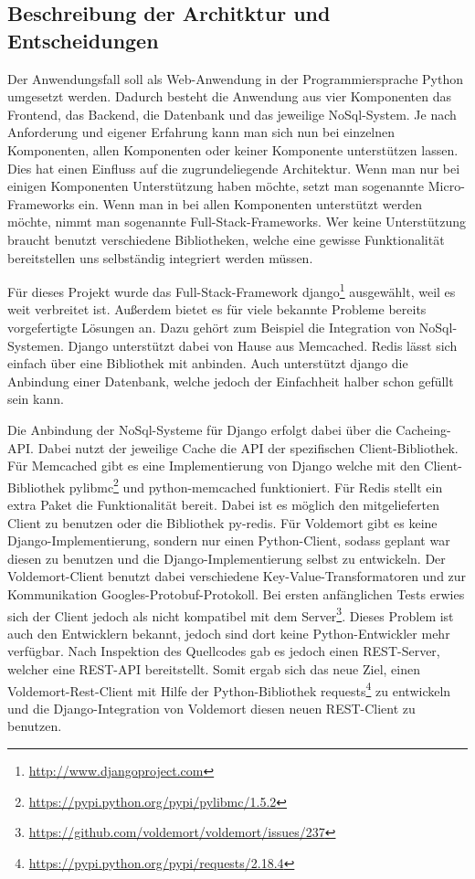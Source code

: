 {\subsection{Beschreibung der Architktur und Entscheidungen}
Der Anwendungsfall soll als Web-Anwendung in der Programmiersprache Python
umgesetzt werden. Dadurch besteht die Anwendung aus vier Komponenten das
Frontend, das Backend, die Datenbank und das jeweilige NoSql-System. Je nach
Anforderung und eigener Erfahrung kann man sich nun bei einzelnen Komponenten,
allen Komponenten oder keiner Komponente unterstützen lassen. Dies hat einen
Einfluss auf die zugrundeliegende Architektur. Wenn man nur bei einigen
Komponenten Unterstützung haben möchte, setzt man sogenannte Micro-Frameworks
ein. Wenn man in bei allen Komponenten unterstützt werden möchte, nimmt man
sogenannte Full-Stack-Frameworks. Wer keine Unterstützung braucht benutzt
verschiedene Bibliotheken, welche eine gewisse Funktionalität bereitstellen uns
selbständig integriert werden müssen.

Für dieses Projekt wurde das Full-Stack-Framework
django\footnote{\url{http://www.djangoproject.com}} ausgewählt, weil es weit
verbreitet ist. Außerdem bietet es für viele bekannte Probleme bereits
vorgefertigte Lösungen an. Dazu gehört zum Beispiel die Integration von
NoSql-Systemen. Django unterstützt dabei von Hause aus Memcached. Redis lässt
sich einfach über eine Bibliothek mit anbinden. Auch unterstützt django die
Anbindung einer Datenbank, welche jedoch der Einfachheit halber schon gefüllt
sein kann.

Die Anbindung der NoSql-Systeme für Django erfolgt dabei über die Cacheing-API.
Dabei nutzt der jeweilige Cache die API der spezifischen Client-Bibliothek. Für
Memcached gibt es eine Implementierung von Django welche mit den
Client-Bibliothek
pylibmc\footnote{\url{https://pypi.python.org/pypi/pylibmc/1.5.2}} und
python-memcached funktioniert. Für Redis stellt ein extra Paket die
Funktionalität bereit. Dabei ist es möglich den mitgelieferten Client zu
benutzen oder die Bibliothek py-redis. Für Voldemort gibt es keine
Django-Implementierung, sondern nur einen Python-Client, sodass geplant war
diesen zu benutzen und die Django-Implementierung selbst zu entwickeln. Der
Voldemort-Client benutzt dabei verschiedene Key-Value-Transformatoren und zur
Kommunikation Googles-Protobuf-Protokoll. Bei ersten anfänglichen Tests erwies
sich der Client jedoch als nicht kompatibel mit dem
Server\footnote{\url{https://github.com/voldemort/voldemort/issues/237}}.
Dieses Problem ist auch den Entwicklern bekannt, jedoch sind dort keine
Python-Entwickler mehr verfügbar. Nach Inspektion des Quellcodes gab es jedoch
einen REST-Server, welcher eine REST-API bereitstellt. Somit ergab sich das
neue Ziel, einen Voldemort-Rest-Client mit Hilfe der Python-Bibliothek
requests\footnote{\url{https://pypi.python.org/pypi/requests/2.18.4}} zu
entwickeln und die Django-Integration von Voldemort diesen neuen REST-Client zu
benutzen.

}

